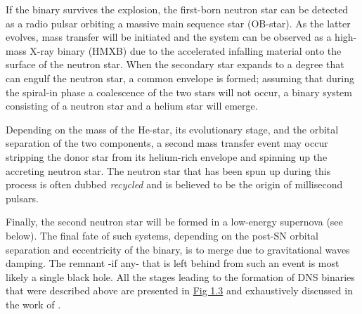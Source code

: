 \documentclass[../../main/thesis_msc.tex]{subfiles}
\begin{document}
				If the binary survives the explosion, the first-born neutron star can be detected as a radio pulsar orbiting a massive main sequence star (OB-star). As the latter evolves, mass transfer will be initiated and the system can be observed as a high-mass X-ray binary (HMXB) due to the accelerated infalling material onto the surface of the neutron star. When the secondary star expands to a degree that can engulf the neutron star, a common envelope is formed; assuming that during the spiral-in phase a coalescence of the two stars will not occur, a binary system consisting of a neutron star and a helium star will emerge.
				
				Depending on the mass of the He-star, its evolutionary stage, and the orbital separation of the two components, a second mass transfer event may occur stripping the donor star from its helium-rich envelope and spinning up the accreting neutron star. The neutron star that has been spun up during this process is often dubbed \emph{recycled} and is believed to be the origin of millisecond pulsars.
				
				Finally, the second neutron star will be formed in a low-energy supernova (see below). The final fate of such systems, depending on the post-SN orbital separation and eccentricity of the binary, is to merge due to gravitational waves damping. The remnant -if any- that is left behind from such an event is most likely a single black hole. All the stages leading to the formation of DNS binaries that were described above are presented in \hyperref[fig:DNS]{Fig 1.3} and exhaustively discussed in the work of \cite{Tauris2017}.
				
\end{document}
